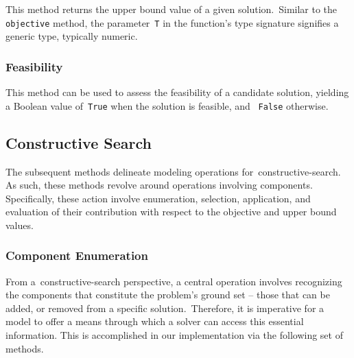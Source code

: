 \begin{center}
\end{center}

This method returns the upper bound value of a given solution.~Similar to the
\texttt{objective} method, the parameter~\texttt{T} in the function's type
signature signifies a generic type, typically numeric.

\subsubsection*{Feasibility}

\begin{center}
\end{center}

This method can be used to assess the feasibility of a candidate solution,
yielding a Boolean value of~\texttt{True} when the solution is feasible, and
~\texttt{False} otherwise.

\subsection{Constructive Search}

The subsequent methods delineate modeling operations
for~\acrshort{constructive-search}. As such, these methods revolve around
operations involving components. Specifically, these action involve enumeration,
selection, application, and evaluation of their contribution with respect to the
objective and upper bound values.

\subsubsection*{Component Enumeration}

From a~\acrshort{constructive-search} perspective, a central operation involves
recognizing the components that constitute the problem's ground set -- those
that can be added, or removed from a specific solution.~Therefore, it is
imperative for a model to offer a means through which a solver can access this
essential information. This is accomplished in our implementation via the
following set of methods.

\begin{center}

\end{center}

